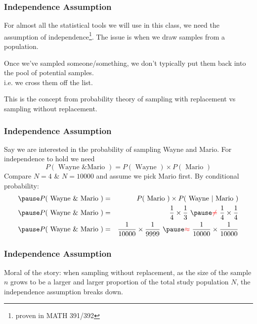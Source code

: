 \documentclass[handout]{beamer}
\newcommand{\blue}[1]{\textcolor{blue2}{#1}}
\newcommand{\red}[1]{\textcolor{red}{#1}}
\begin{document}
\begin{frame}[fragile]
\frametitle{Independence Assumption}
For almost \blue{all} the statistical tools we will use in this class, we need the assumption of independence\footnote{proven in MATH 391/392}.  The issue is when we draw samples from a population.  

\vspace{0.5cm}
\pause
Once we've sampled someone/something, we don't typically \blue{put them back} into the pool of potential samples.\\
i.e. we cross them off the list.  

\vspace{0.5cm}
\pause
This is the concept from probability theory of \blue{sampling with replacement} vs \blue{sampling without replacement}. 

\end{frame}


\begin{frame}[fragile]
\frametitle{Independence Assumption}

Say we are interested in the probability of sampling Wayne and Mario.  For independence to hold we need
\[
P(\mbox{ Wayne \& Mario }) = P(\mbox{ Wayne }) \times P(\mbox{ Mario })
\]
\pause
Compare $N=4$ \& $N=10000$ and assume we pick Mario first.  By conditional probability:
\begin{eqnarray*}
\pause P(\mbox{ Wayne \& Mario }) &=& P(\mbox{ Mario }) \times P(\mbox{ Wayne }|\mbox{ Mario }) \\
\pause P(\mbox{ Wayne \& Mario }) &=& \frac{1}{4}\times\frac{1}{3} \ \pause \red{\neq} \  \frac{1}{4}\times\frac{1}{4}\\
\pause P(\mbox{ Wayne \& Mario }) &=& \frac{1}{10000}\times\frac{1}{9999} \ \pause \red{\approx} \ \frac{1}{10000}\times\frac{1}{10000}
\end{eqnarray*}

\end{frame}


\begin{frame}[fragile]
\frametitle{Independence Assumption}

\blue{Moral of the story}:  when sampling without replacement, as the size of the sample $n$ grows to be a larger and larger proportion of the total study population $N$, the independence assumption breaks down.  

\end{frame}
\end{document}
